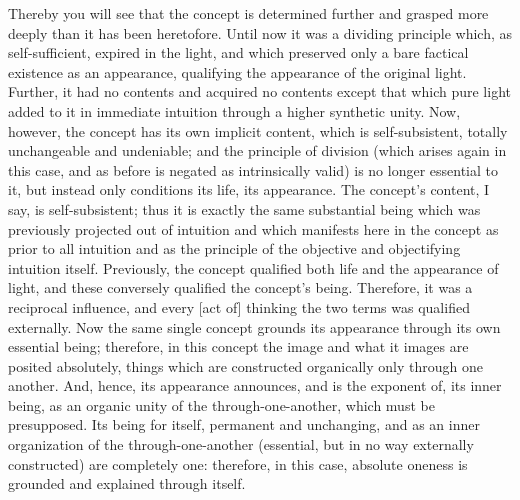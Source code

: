 Thereby you will see that the concept is
determined further and grasped more deeply
than it has been heretofore.
Until now it was a dividing principle
which, as self-sufficient, expired in the light,
and which preserved only a bare
factical existence as an appearance,
qualifying the appearance of the original light.
Further, it had no contents and acquired no contents
except that which pure light added to it
in immediate intuition through a higher synthetic unity.
Now, however, the concept has its own implicit content,
which is self-subsistent, totally unchangeable and undeniable;
and the principle of division
(which arises again in this case,
and as before is negated as intrinsically valid)
is no longer essential to it,
but instead only conditions its life,
its appearance.
The concept’s content, I say, is self-subsistent;
thus it is exactly the same substantial being
which was previously projected out of intuition
and which manifests here in the concept
as prior to all intuition
and as the principle of
the objective and objectifying intuition itself.
Previously, the concept qualified
both life and the appearance of light,
and these conversely qualified the concept’s being.
Therefore, it was a reciprocal influence,
and every [act of] thinking the two terms
was qualified externally.
Now the same single concept
grounds its appearance
through its own essential being;
therefore, in this concept
the image and what it images
are posited absolutely,
things which are constructed
organically only through one another.
And, hence, its appearance announces,
and is the exponent of, its inner being,
as an organic unity of the through-one-another,
which must be presupposed.
Its being for itself,
permanent and unchanging,
and as an inner organization of
the through-one-another
(essential, but in no way externally constructed)
are completely one:
therefore, in this case,
absolute oneness is grounded
and explained through itself.

